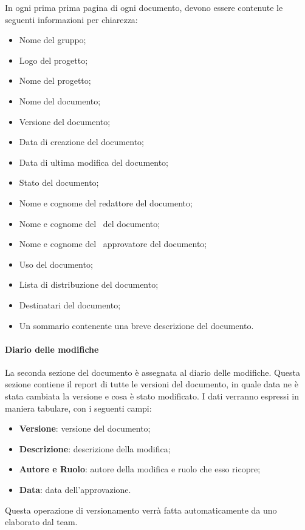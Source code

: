 \documentclass[../NormeDiProgetto.tex]{subfiles}
\begin{document}
In ogni prima prima pagina di ogni documento, devono essere contenute le seguenti informazioni per chiarezza:
\begin{itemize}
  \item Nome del gruppo;
  \item Logo del progetto;
  \item Nome del progetto;
  \item Nome del documento;
  \item Versione del documento;
  \item Data di creazione del documento;
  \item Data di ultima modifica del documento;
  \item Stato del documento;
  \item Nome e cognome del redattore del documento;
  \item Nome e cognome del \verificatore\ del documento;
  \item Nome e cognome del \responsabilediprogetto\ approvatore del documento;
  \item Uso del documento;
  \item Lista di distribuzione del documento;
  \item Destinatari del documento;
  \item Un sommario contenente una breve descrizione del documento.
\end{itemize}

\paragraph{Diario delle modifiche}
La seconda sezione del documento è assegnata al diario delle modifiche. Questa sezione contiene il report di tutte le versioni del documento, in quale data ne è stata cambiata la versione e cosa è stato modificato. I dati verranno espressi in maniera tabulare, con i seguenti campi:
\begin{itemize}
  \item \textbf{Versione}: versione del documento;
  \item \textbf{Descrizione}: descrizione della modifica;
  \item \textbf{Autore e Ruolo}: autore della modifica e ruolo che esso ricopre;
  \item \textbf{Data}: data dell'approvazione.
\end{itemize}
Questa operazione di versionamento verrà fatta automaticamente da uno   elaborato dal team.
\end{document}
